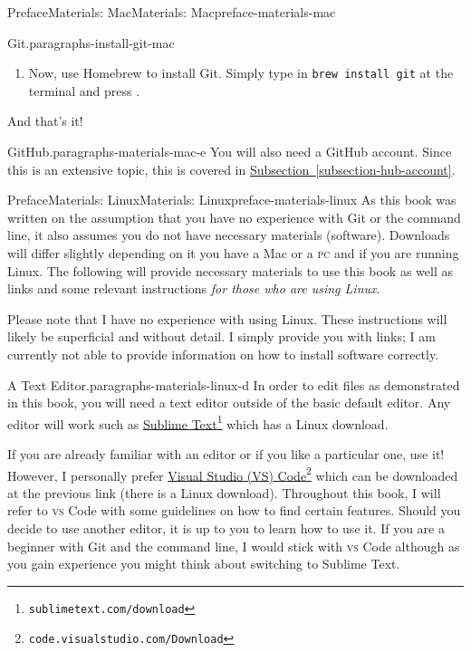 \documentclass[oneside,10pt,]{book}
\newcommand{\xreffont}{\relax}
\newcommand{\mono}[1]{\texttt{#1}}
\newcommand{\initialism}[1]{\textsc{\MakeLowercase{#1}}}
\newcommand{\kbd}[1]{\keys{{#1}}}
\begin{document}
\begin{preface}{Preface}{Materials: Mac}{}{Materials: Mac}{}{}{preface-materials-mac}
\begin{paragraphs}{Git.}{paragraphs-install-git-mac}
\begin{enumerate}
\item{}Now, use Homebrew to install Git. Simply type in \mono{brew install git} at the terminal and press \kbd{Enter}.%
\end{enumerate}
And that's it!%
\end{paragraphs}%
\begin{paragraphs}{GitHub.}{paragraphs-materials-mac-e}%
You will also need a GitHub account. Since this is an extensive topic, this is covered in \hyperref[subsection-hub-account]{Subsection~{\xreffont\ref{subsection-hub-account}}}.%
\end{paragraphs}%
\end{preface}
%
%
\typeout{************************************************}
\typeout{************************************************}
%
\begin{preface}{Preface}{Materials: Linux}{}{Materials: Linux}{}{}{preface-materials-linux}
As this book was written on the assumption that you have no experience with Git or the command line, it also assumes you do not have necessary materials (software). Downloads will differ slightly depending on it you have a Mac or a \initialism{PC} and if you are running Linux. The following will provide necessary materials to use this book as well as links and some relevant instructions \emph{for those who are using Linux}.%
\par
Please note that I have no experience with using Linux. These instructions will likely be superficial and without detail. I simply provide you with links; I am currently not able to provide information on how to install software correctly.%
\begin{paragraphs}{A Text Editor.}{paragraphs-materials-linux-d}%
In order to edit files as demonstrated in this book, you will need a text editor outside of the basic default editor. Any editor will work such as \href{https://www.sublimetext.com/download}{Sublime Text}\footnote{\nolinkurl{sublimetext.com/download}\label{fn-materials-linux-d-b-b}} which has a Linux download.%
\par
If you are already familiar with an editor or if you like a particular one, use it! However, I personally prefer \href{https://code.visualstudio.com/Download}{Visual Studio (VS) Code}\footnote{\nolinkurl{code.visualstudio.com/Download}\label{fn-materials-linux-d-c-b}} which can be downloaded at the previous link (there is a Linux download). Throughout this book, I will refer to \initialism{VS} Code with some guidelines on how to find certain features. Should you decide to use another editor, it is up to you to learn how to use it. If you are a beginner with Git and the command line, I would stick with \initialism{VS} Code although as you gain experience you might think about switching to Sublime Text.%

\end{paragraphs}
\end{preface}
\end{document}
